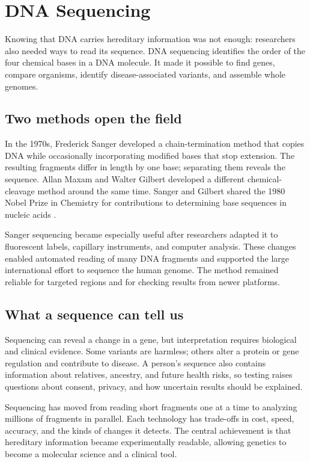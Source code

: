 \documentclass[12pt,oneside]{book}
\begin{document}
\chapter[DNA Sequencing]{DNA Sequencing}

Knowing that DNA carries hereditary information was not enough: researchers
also needed ways to read its sequence. DNA sequencing identifies the order of
the four chemical bases in a DNA molecule. It made it possible to find genes,
compare organisms, identify disease-associated variants, and assemble whole
genomes.

\section{Two methods open the field}
In the 1970s, Frederick Sanger developed a chain-termination method that
copies DNA while occasionally incorporating modified bases that stop
extension. The resulting fragments differ in length by one base; separating
them reveals the sequence. Allan Maxam and Walter Gilbert developed a
different chemical-cleavage method around the same time. Sanger and Gilbert
shared the 1980 Nobel Prize in Chemistry for contributions to determining
base sequences in nucleic acids \cite{sangerNobel}.

Sanger sequencing became especially useful after researchers adapted it to
fluorescent labels, capillary instruments, and computer analysis. These
changes enabled automated reading of many DNA fragments and supported the
large international effort to sequence the human genome. The method remained
reliable for targeted regions and for checking results from newer platforms.

\section{What a sequence can tell us}
Sequencing can reveal a change in a gene, but interpretation requires
biological and clinical evidence. Some variants are harmless; others alter a
protein or gene regulation and contribute to disease. A person's sequence
also contains information about relatives, ancestry, and future health risks,
so testing raises questions about consent, privacy, and how uncertain results
should be explained.

Sequencing has moved from reading short fragments one at a time to analyzing
millions of fragments in parallel. Each technology has trade-offs in cost,
speed, accuracy, and the kinds of changes it detects. The central achievement
is that hereditary information became experimentally readable, allowing
genetics to become a molecular science and a clinical tool.
\end{document}
